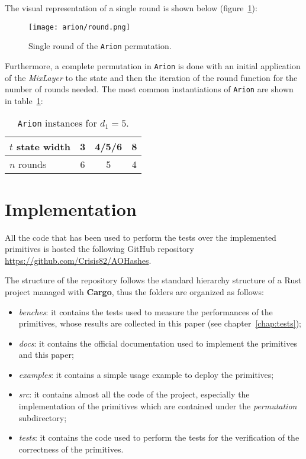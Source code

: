\documentclass[12pt, a4paper]{report}
\begin{document}
The visual representation of a single round is shown below (figure~\ref{fig:arion}):

\begin{figure}[H]
  \begin{center}
    \texttt{[image: arion/round.png]}
  \end{center}
  \caption{Single round of the \texttt{Arion} permutation.}\label{fig:arion}
\end{figure}

Furthermore, a complete permutation in \texttt{Arion} is done with an initial application of the \textit{MixLayer} to the state and then the iteration of the round function for the number of rounds needed.
The most common instantiations of \texttt{Arion} are shown in table~\ref{tab:aneomiinstances}:
\begin{table}[H]
  \caption{\texttt{Arion} instances for $d_1 = 5$.}\label{tab:aneomiinstances}
  \begin{center}
    \begin{tabular}{|l|c|c|c|}
      \hline
      $t$ state width & 3 & 4/5/6 & 8 \\
      \hline
      $n$ rounds & 6 & 5 & 4 \\
      \hline
    \end{tabular}
  \end{center}
\end{table}

\section{Implementation}\label{sec:implementation}

All the code that has been used to perform the tests over the implemented primitives is hosted the following GitHub repository \url{https://github.com/Crisis82/AOHashes}.

The structure of the repository follows the standard hierarchy structure of a Rust project managed with \textbf{Cargo}, thus the folders are organized as follows:
\begin{itemize}
  \item \textit{benches}: it contains the tests used to measure the performances of the primitives, whose results are collected in this paper (see chapter~\ref{chap:tests});
  \item \textit{docs}: it contains the official documentation used to implement the primitives and this paper;
  \item \textit{examples}: it contains a simple usage example to deploy the primitives;
  \item \textit{src}: it contains almost all the code of the project, especially the implementation of the primitives which are contained under the \textit{permutation} subdirectory;
  \item \textit{tests}: it contains the code used to perform the tests for the verification of the correctness of the primitives.
\end{itemize}
\end{document}
